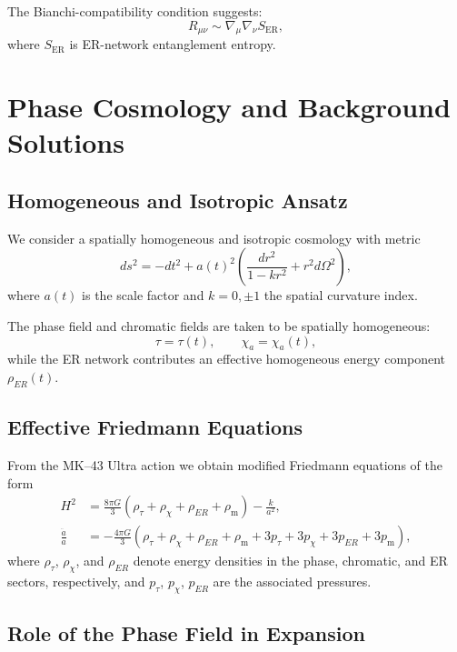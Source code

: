 The Bianchi-compatibility condition suggests:
\[
R_{\mu\nu} \sim \nabla_\mu\nabla_\nu S_{\mathrm{ER}},
\]
where $S_{\mathrm{ER}}$ is ER-network entanglement entropy.


\chapter{Phase Cosmology and Background Solutions}

\section{Homogeneous and Isotropic Ansatz}

We consider a spatially homogeneous and isotropic cosmology with metric
\[
  ds^2 = -dt^2 + a(t)^2 \left( \frac{dr^2}{1-kr^2} + r^2 d\Omega^2 \right),
\]
where $a(t)$ is the scale factor and $k=0,\pm 1$ the spatial curvature index.

The phase field and chromatic fields are taken to be spatially homogeneous:
\[
  \tau = \tau(t), \qquad \chi_a = \chi_a(t),
\]
while the ER network contributes an effective homogeneous energy component $\rho_{ER}(t)$.

\section{Effective Friedmann Equations}

From the MK--43 Ultra action we obtain modified Friedmann equations of the form
\begin{align}
  H^2 &=
  \frac{8\pi G}{3}\left(\rho_\tau + \rho_\chi + \rho_{ER} + \rho_{\mathrm{m}}\right)
  - \frac{k}{a^2},
  \\
  \frac{\ddot{a}}{a} &=
  -\frac{4\pi G}{3}\left(
    \rho_\tau + \rho_\chi + \rho_{ER} + \rho_{\mathrm{m}}
    + 3p_\tau + 3p_\chi + 3p_{ER} + 3p_{\mathrm{m}}
  \right),
\end{align}
where $\rho_\tau$, $\rho_\chi$, and $\rho_{ER}$ denote energy densities in the phase, chromatic, and ER sectors, respectively, and $p_\tau$, $p_\chi$, $p_{ER}$ are the associated pressures.

\section{Role of the Phase Field in Expansion}

